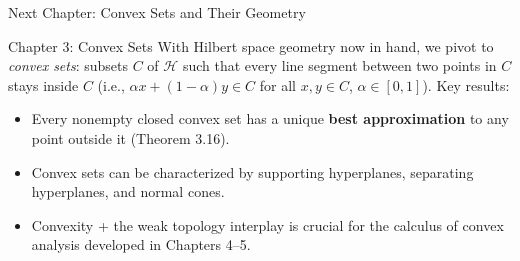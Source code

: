 \documentclass[aspectratio=169,10pt]{beamer}
\newcommand{\Hil}{\mathcal{H}}
\begin{document}
\begin{frame}{Next Chapter: Convex Sets and Their Geometry}

  \begin{block}{Chapter 3: Convex Sets}
    With Hilbert space geometry now in hand, we pivot to \emph{convex sets}:
    subsets $C$ of $\Hil$ such that every line segment between two points in
    $C$ stays inside $C$ (i.e., $\alpha x + (1-\alpha)y \in C$ for all $x,y
    \in C$, $\alpha \in [0,1]$). Key results:
    \begin{itemize}
      \item Every nonempty closed convex set has a unique \textbf{best
        approximation} to any point outside it (Theorem 3.16).
      \item Convex sets can be characterized by supporting hyperplanes,
        separating hyperplanes, and normal cones.
      \item Convexity + the weak topology interplay is crucial for the
        calculus of convex analysis developed in Chapters 4--5.
    \end{itemize}
  \end{block}

\end{frame}
\end{document}
